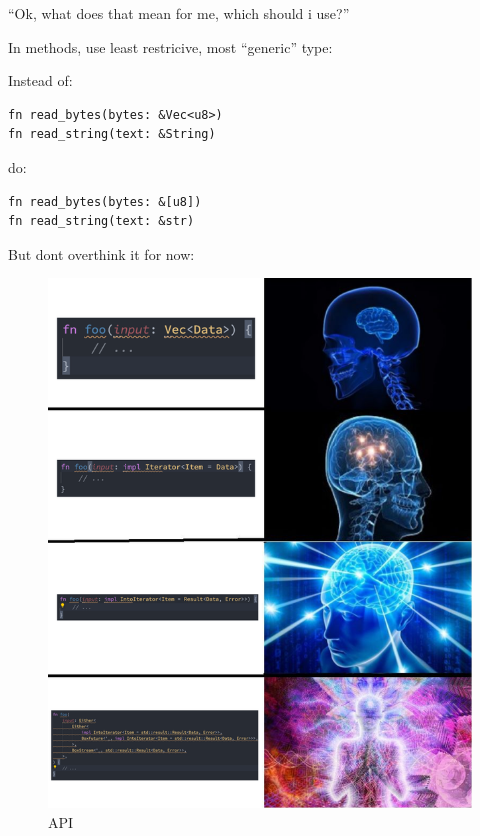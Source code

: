 \documentclass[
  9pt,
  ignorenonframetext,
]{beamer}
\begin{document}
\begin{frame}[fragile]
``Ok, what does that mean for me, which should i use?''

In methods, use least restricive, most ``generic'' type:

Instead of:

\begin{lstlisting}
fn read_bytes(bytes: &Vec<u8>)
fn read_string(text: &String)
\end{lstlisting}

do:

\begin{lstlisting}
fn read_bytes(bytes: &[u8])
fn read_string(text: &str)
\end{lstlisting}
\end{frame}

\begin{frame}
But dont overthink it for now:

\begin{figure}
\centering
\includegraphics{img/api.jpg}
\caption{API}
\end{figure}
\end{frame}
\end{document}
